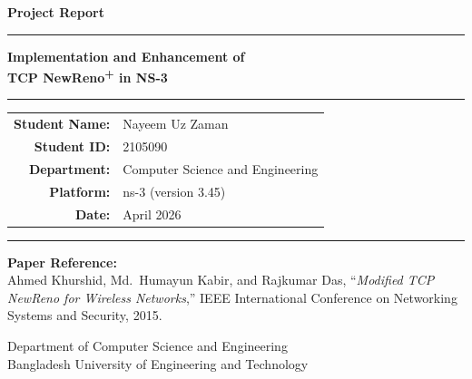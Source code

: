 \documentclass[12pt,a4paper]{article}
\begin{document}

\begin{titlepage}
    \centering
    \vspace*{1.2cm}
    {\LARGE\bfseries Project Report\par}
    \vspace{0.4cm}
    \rule{0.85\linewidth}{1.2pt}
    \vspace{0.4cm}
    {\Large\bfseries Implementation and Enhancement of\\[0.4em]
    TCP NewReno\textsuperscript{+} in NS-3\par}
    \vspace{0.3cm}
    \rule{0.85\linewidth}{0.5pt}
    \vspace{1.2cm}

    {\large
    \begin{tabular}{rl}
        \textbf{Student Name:} & Nayeem Uz Zaman \\[4pt]
        \textbf{Student ID:}   & 2105090 \\[4pt]
        \textbf{Department:}   & Computer Science and Engineering \\[4pt]
        \textbf{Platform:}     & ns-3 (version 3.45) \\[4pt]
        \textbf{Date:}         & April 2026 \\
    \end{tabular}
    }

    \vspace{1.5cm}
    \rule{0.85\linewidth}{0.5pt}
    \vspace{0.8cm}

    \begin{minipage}{0.85\textwidth}
    \textbf{Paper Reference:}\\[0.4em]
    Ahmed Khurshid, Md.\ Humayun Kabir, and Rajkumar Das,
    ``\textit{Modified TCP NewReno for Wireless Networks},''
    IEEE International Conference on Networking Systems and Security, 2015.
    \end{minipage}

    \vfill
    {\small Department of Computer Science and Engineering\\
    Bangladesh University of Engineering and Technology}
\end{titlepage}


\end{document}
